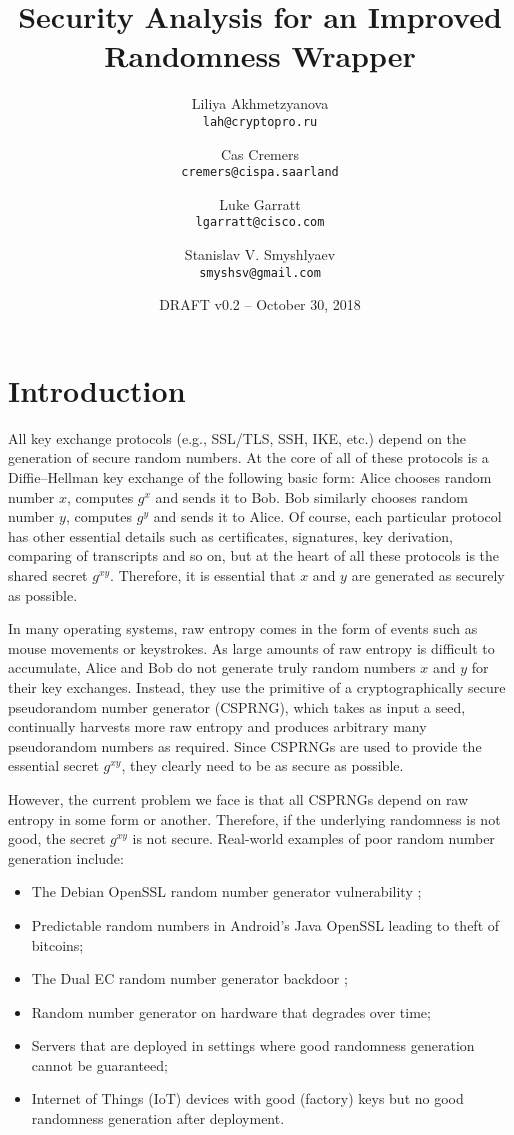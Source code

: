 \documentclass{article}
\author{
  Liliya Akhmetzyanova\\
  \texttt{lah@cryptopro.ru}
  \and
  Cas Cremers\\
  \texttt{cremers@cispa.saarland}
  \and
  Luke Garratt\\
  \texttt{lgarratt@cisco.com}
  \and
  Stanislav V. Smyshlyaev\\
  \texttt{smyshsv@gmail.com}
}
\title{Security Analysis for an Improved Randomness Wrapper}
\date{DRAFT v0.2 -- October 30, 2018}
\begin{document}
  \maketitle


\section{Introduction}
All key exchange protocols (e.g., SSL/TLS, SSH, IKE, etc.) depend on the generation of secure random numbers. At the core of all of these protocols is a Diffie--Hellman key exchange of the following basic form: Alice chooses random number $x$, computes $g^x$ and sends it to Bob. Bob similarly chooses random number $y$, computes $g^y$ and sends it to Alice. Of course, each particular protocol has other essential details such as certificates, signatures, key derivation, comparing of transcripts and so on, but at the heart of all these protocols is the shared secret $g^{xy}$. Therefore, it is essential that $x$ and $y$ are generated as securely as possible. 

In many operating systems, raw entropy comes in the form of events such as mouse movements or keystrokes. As large amounts of raw entropy is difficult to accumulate, Alice and Bob do not generate truly random numbers $x$ and $y$ for their key exchanges. Instead, they use the primitive of a cryptographically secure pseudorandom number generator (CSPRNG), which takes as input a seed, continually harvests more raw entropy and  produces arbitrary many pseudorandom numbers as required. Since CSPRNGs are used to provide the essential secret $g^{xy}$, they clearly need to be as secure as possible. 

However, the current problem we face is that all CSPRNGs depend on raw entropy in some form or another. Therefore, if the underlying randomness is not good, the secret $g^{xy}$ is not secure. Real-world examples of poor random number generation include:

\begin{itemize}
\item The Debian OpenSSL random number generator vulnerability \cite{DebianRNGflaw, DebianRNGflawTLSDHE};

\item Predictable random numbers in Android's Java OpenSSL \cite{MarvinGoogle2013} leading to theft of bitcoins;

\item The Dual EC random number generator backdoor \cite{DualECstandardisedbackdoor};

\item Random number generator on hardware that degrades over time;

\item Servers that are deployed in settings where good randomness generation cannot be guaranteed;

\item Internet of Things (IoT) devices with good (factory) keys but no good randomness generation after deployment.
\end{itemize}
\end{document}
